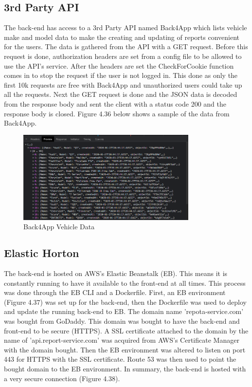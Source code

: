 \subsection{3rd Party API}
The back-end has access to a 3rd Party API named Back4App which lists vehicle make and model data to make the creating and updating of reports convenient for the users. The data is gathered from the API with a GET request. Before this request is done, authorization headers are set from a config file to be allowed to use the API's service. After the headers are set the CheckForCookie function comes in to stop the request if the user is not logged in. This done as only the first 10k requests are free with Back4App and unauthorized users could take up all the requests. Next the GET request is done and the JSON data is decoded from the response body and sent the client with a status code 200 and the response body is closed. Figure 4.36 below shows a sample of the data from Back4App.

\begin{figure}[H]
    \caption{Back4App Vehicle Data}
    \label{image:back4app}
    \centering
    \includegraphics[width=0.8\textwidth]{images/horton/back4app/back4app_data.png}
\end{figure}

\subsection{Elastic Horton}
The back-end is hosted on AWS's Elastic Beanstalk (EB). This means it is constantly running to have it available to the front-end at all times. This process was done through the EB CLI and a Dockerfile. First, an EB environment (Figure 4.37) was set up for the back-end, then the Dockerfile was used to deploy and update the running back-end to EB. The domain name 'repota-service.com' was bought from GoDaddy. This domain was bought to have the back-end and front-end to be secure (HTTPS). A SSL certificate attached to the domain by the name of 'api.report-service.com' was acquired from AWS's Certificate Manager with the domain bought. Then the EB environment was altered to listen on port 443 for HTTPS with the SSL certificate. Route 53 was then used to point the bought domain to the EB environment. In summary, the back-end is hosted with a very secure connection (Figure 4.38).

